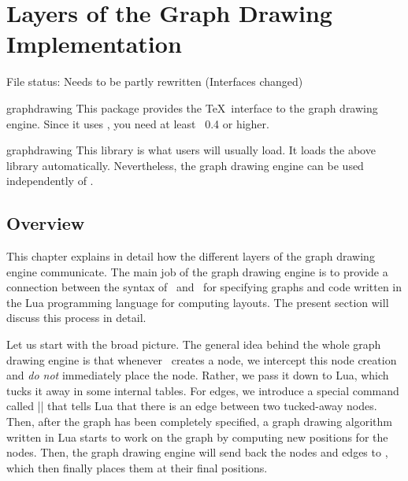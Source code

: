 %
%
%


\section{Layers of the Graph Drawing Implementation}

{}

\label{section-base-graphdrawing}
\label{section-gd-internals}

File status: Needs to be partly rewritten (Interfaces changed)


\begin{pgflibrary}{graphdrawing}
  This package provides the \TeX\ interface to the graph drawing
  engine. Since it uses \LuaTeX, you need at least \LuaTeX\ 0.4 or 
  higher.
\end{pgflibrary}

\begin{tikzlibrary}{graphdrawing}
  This library is what users will usually load. It loads the above
  library automatically. Nevertheless, the graph drawing engine can be
  used independently of \tikzname.
\end{tikzlibrary}



\subsection{Overview}

This chapter explains in detail how the different layers of the graph
drawing engine communicate. The main job of the graph drawing engine
is to provide a connection between the syntax of \tikzname\
and \pgfname\ for specifying graphs and code written in the Lua
programming language for computing layouts. The present section will
discuss this process in detail.

Let us start with the broad picture. The general idea behind the whole
graph drawing engine is that whenever \pgfname\ creates a node, we
intercept this node creation and \emph{do not} immediately place the
node. Rather, we pass it down to Lua, which tucks it away in
some internal tables. For edges, we introduce a special command called
|\pgfgdedge| that tells Lua that there is an edge between two
tucked-away nodes. Then, after the graph has been completely
specified, a graph drawing algorithm written in Lua starts to work on
the graph by computing new positions for the nodes. Then, the graph
drawing engine will send back the nodes and edges to \pgfname, which
then finally places them at their final positions.

